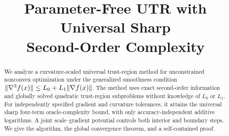 \documentclass[11pt]{article}
\title{Parameter-Free UTR with Universal Sharp\texorpdfstring{\\}{ }Second-Order Complexity}
\author{}
\date{}
\begin{document}
\maketitle
\begin{abstract}
We analyze a curvature-scaled universal trust-region method for
unconstrained nonconvex optimization under the generalized smoothness
condition $\lVert\nabla^3 f(x)\rVert\le L_0+L_1\lVert\nabla f(x)\rVert$.
The method uses exact second-order information and globally solved
quadratic trust-region subproblems without knowledge of $L_0$ or $L_1$.
For independently specified gradient and curvature tolerances, it
attains the universal sharp four-term oracle-complexity bound, with
only accuracy-independent additive logarithms. A joint scale--gradient
potential controls both interior and boundary steps. We give the
algorithm, the global convergence theorem, and a self-contained proof.
\end{abstract}








\end{document}
